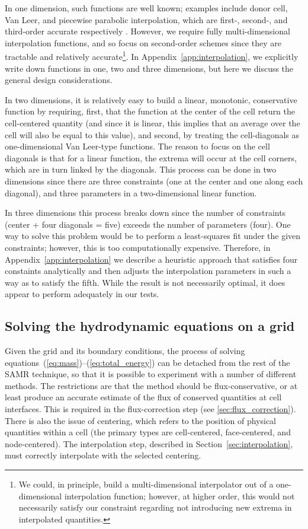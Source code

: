In one dimension, such functions are well known; examples include
donor cell, Van Leer, and piecewise parabolic interpolation, which are
first-, second-, and third-order accurate respectively
\citep[e.g.,][]{Stone92a}.  However, we require fully
multi-dimensional interpolation functions, and so focus on
second-order schemes since they are tractable and relatively
accurate\footnote{We could, in principle, build a multi-dimensional
interpolator out of a one-dimensional interpolation function; however,
at higher order, this would not necessarily satisfy our constraint
regarding not introducing new extrema in interpolated quantities.}.
In Appendix~\ref{app:interpolation}, we explicitly write down
functions in one, two and three dimensions, but here we discuss the
general design considerations.

In two dimensions, it is relatively easy to build a linear, monotonic,
conservative function by requiring, first, that the function at the
center of the cell return the cell-centered quantity (and since it is
linear, this implies that an average over the cell will also be equal
to this value), and second, by treating the cell-diagonals as
one-dimensional Van Leer-type functions.  The reason to focus on the
cell diagonals is that for a linear function, the extrema will occur
at the cell corners, which are in turn linked by the diagonals.  This
process can be done in two dimensions since there are three
constraints (one at the center and one along each diagonal), and three
parameters in a two-dimensional linear function.

In three dimensions this process breaks down since the number of
constraints (center + four diagonals = five) exceeds the number of
parameters (four).  One way to solve this problem would be to perform
a least-squares fit under the given constraints; however, this is too
computationally expensive.  Therefore, in
Appendix~\ref{app:interpolation} we describe a heuristic approach that
satisfies four constaints analytically and then adjusts the
interpolation parameters in such a way as to satisfy the fifth.  While
the result is not necessarily optimal, it does appear to perform
adequately in our tests.

\subsection{Solving the hydrodynamic equations on a grid}
\label{sec:solve_hydro}

Given the grid and its boundary conditions, the process of solving
equations~(\ref{eq:mass})--(\ref{eq:total_energy}) can be detached
from the rest of the SAMR technique, so that it is possible to
experiment with a number of different methods.  The restrictions are
that the method should be flux-conservative, or at least produce an
accurate estimate of the flux of conserved quantities at cell
interfaces.  This is required in the flux-correction step (see
\ref{sec:flux_correction}).  There is also the issue of centering,
which refers to the position of physical quantities within a cell (the
primary types are cell-centered, face-centered, and node-centered).
The interpolation step, described in Section~\ref{sec:interpolation},
must correctly interpolate with the selected centering.

